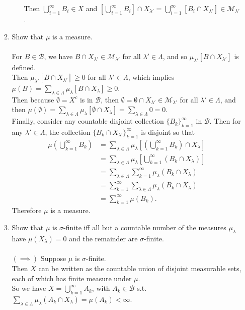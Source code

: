 \begin{enumerate}
\begin{enumerate}[label=(\roman*),align=left]
\begin{enumerate}[label=(\roman*),align=left]
			Then $\bigcup_{i=1}^\infty B_i\in X$ and $[\bigcup_{i=1}^\infty B_i]\cap X_{\lambda'} =\bigcup_{i=1}^\infty [B_i\cap X_{\lambda'}]\in\mathcal{M}_{\lambda'}$.
		\end{enumerate}
		\item Show that $\mu$ is a measure.\\
		\\For $B\in\mathcal{B}$, we have $B\cap X_{\lambda'}\in\mathcal{M}_{\lambda'}$ for all $\lambda'\in\Lambda$, and so $\mu_{\lambda'}[B\cap X_{\lambda'}]$ is defined.
		\\Then $\mu_{\lambda'}[B\cap X_{\lambda'}]\ge0$ for all $\lambda'\in\Lambda$, which implies $\mu(B)=\sum_{\lambda\in\Lambda}\mu_\lambda[B\cap X_\lambda]\ge0$.
		\\Then because $\emptyset=X^c$ is in $\mathcal{B}$, then $\emptyset=\emptyset\cap X_{\lambda'}\in\mathcal{M}_{\lambda'}$ for all $\lambda'\in\Lambda$, and then $\mu(\emptyset)=\sum_{\lambda\in\Lambda}\mu_\lambda[\emptyset\cap X_\lambda]=\sum_{\lambda\in\Lambda}0=0$.
		\\Finally, consider any countable disjoint collection $\{B_k\}_{k=1}^\infty$ in $\mathcal{B}$.
		Then for any $\lambda'\in\Lambda$, the collection $\{B_k\cap X_{\lambda'}\}_{k=1}^\infty$ is disjoint so that 
		\begin{align*}
			\mu(\bigcup_{k=1}^\infty B_k)&= \sum_{\lambda\in\Lambda}\mu_\lambda[(\bigcup_{k=1}^\infty B_k)\cap X_\lambda]\\
			&=\sum_{\lambda\in\Lambda}\mu_\lambda[\bigcup_{k=1}^\infty (B_k\cap X_\lambda)]\\
			&=\sum_{\lambda\in\Lambda}\sum_{k=1}^\infty \mu_\lambda(B_k\cap X_\lambda)\\
			&=\sum_{k=1}^\infty \sum_{\lambda\in\Lambda} \mu_\lambda(B_k\cap X_\lambda)\\
			&=\sum_{k=1}^\infty \mu(B_k).
		\end{align*}
		Therefore $\mu$ is a measure.
		\item Show that $\mu$ is $\sigma$-finite iff all but a countable number of the measures $\mu_\lambda$ have $\mu(X_\lambda)=0$ and the remainder are $\sigma$-finite.\\
		\\$(\implies)$ Suppose $\mu$ is $\sigma$-finite.\\
		Then $X$ can be written as the countable union of disjoint measurable sets, each of which has finite measure under $\mu$.
		\\So we have $X=\bigcup_{k=1}^\infty A_k$, with $A_k\in\mathcal{B}$ s.t. $\sum_{\lambda\in\Lambda} \mu_\lambda(A_k\cap X_\lambda)=\mu(A_k)<\infty$.

\end{enumerate}
\end{enumerate}
